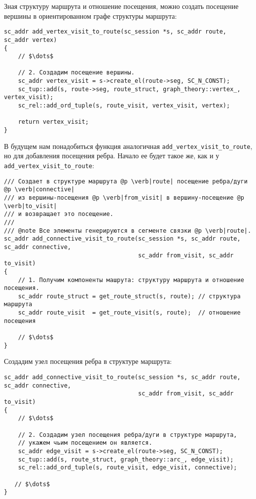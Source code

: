 Зная структуру маршрута и отношение посещения, можно создать посещение
вершины в ориентированном графе структуры маршрута:

\begin{lstlisting}[texcl]
sc_addr add_vertex_visit_to_route(sc_session *s, sc_addr route, sc_addr vertex)
{
    // $\dots$

    // 2. Создадим посещение вершины.
    sc_addr vertex_visit = s->create_el(route->seg, SC_N_CONST);
    sc_tup::add(s, route->seg, route_struct, graph_theory::vertex_, vertex_visit);
    sc_rel::add_ord_tuple(s, route_visit, vertex_visit, vertex);

    return vertex_visit;
}
\end{lstlisting}

В будущем нам понадобиться функция аналогичная
\lstinline|add_vertex_visit_to_route|, но для добавления посещения
ребра. Начало ее будет такое же, как и у
\lstinline|add_vertex_visit_to_route|:

\begin{lstlisting}[texcl]
/// Создает в структуре маршрута @p \verb|route| посещение ребра/дуги @p \verb|connective|
/// из вершины-посещения @p \verb|from_visit| в вершину-посещение @p \verb|to_visit|
/// и возвращает это посещение.
///
/// @note Все элементы генерируются в сегменте связки @p \verb|route|.
sc_addr add_connective_visit_to_route(sc_session *s, sc_addr route, sc_addr connective,
                                      sc_addr from_visit, sc_addr to_visit)
{
    // 1. Получим компоненты машрута: структуру маршрута и отношение посещения.
    sc_addr route_struct = get_route_struct(s, route); // структура маршрута
    sc_addr route_visit  = get_route_visit(s, route);  // отношение посещения

    // $\dots$
}
\end{lstlisting}

Создадим узел посещения ребра в структуре маршрута:

\begin{lstlisting}[texcl]
sc_addr add_connective_visit_to_route(sc_session *s, sc_addr route, sc_addr connective,
                                      sc_addr from_visit, sc_addr to_visit)
{
    // $\dots$

    // 2. Создадим узел посещения ребра/дуги в структуре маршрута,
    // укажем чьим посещением он является.
    sc_addr edge_visit = s->create_el(route->seg, SC_N_CONST);
    sc_tup::add(s, route_struct, graph_theory::arc_, edge_visit);
    sc_rel::add_ord_tuple(s, route_visit, edge_visit, connective);

   // $\dots$
}
\end{lstlisting}

